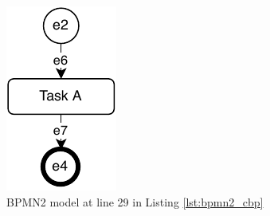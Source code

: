 \documentclass[conference]{IEEEtran}
\begin{document}
\begin{figure}
\begin{subfigure}[t]{0.2\linewidth}
    \includegraphics[width=\linewidth]{bpmn2_32}
    \caption{BPMN2 model at line 29 in Listing \ref{lst:bpmn2_cbp}}
    \label{fig:bpmn2_29}
  \end{subfigure}
  \hfill
  \begin{subfigure}[t]{0.40\linewidth}
    \centering

\end{subfigure}
\end{figure}
\end{document}
